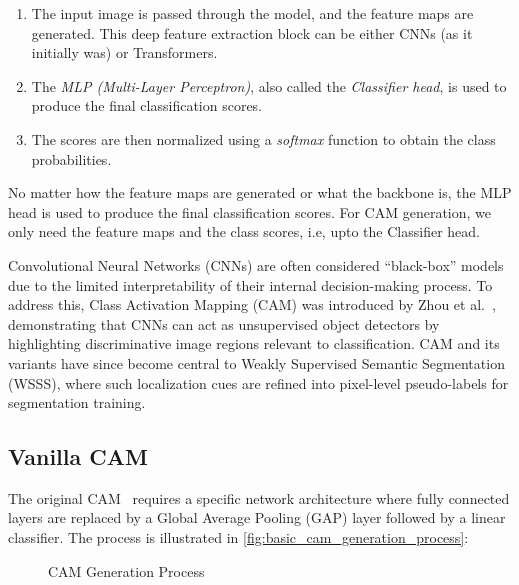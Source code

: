 \begin{enumerate}
    \item The input image is passed through the model, and the feature maps are generated. This deep feature extraction block can be either CNNs (as it initially was) or Transformers.
    \item The \emph{MLP (Multi-Layer Perceptron)}, also called the \emph{Classifier head}, is used to produce the final classification scores.
    \item The scores are then normalized using a \emph{softmax} function to obtain the class probabilities.
\end{enumerate}

No matter how the feature maps are generated or what the backbone is, the MLP head is used to produce the final classification scores. For CAM generation, we only need the feature maps and the class scores, i.e, upto the Classifier head.

Convolutional Neural Networks (CNNs) are often considered “black-box” models due to the limited interpretability of their internal decision-making process. To address this, Class Activation Mapping (CAM) was introduced by Zhou et al.~\cite{cam}, demonstrating that CNNs can act as unsupervised object detectors by highlighting discriminative image regions relevant to classification. CAM and its variants have since become central to Weakly Supervised Semantic Segmentation (WSSS), where such localization cues are refined into pixel-level pseudo-labels for segmentation training.

\subsection{Vanilla CAM}

The original CAM~\cite{cam} requires a specific network architecture where fully connected layers are replaced by a Global Average Pooling (GAP) layer followed by a linear classifier. The process is illustrated in \autoref{fig:basic_cam_generation_process}:

\begin{figure}[htbp]
    \centering
    \caption{CAM Generation Process}
    \label{fig:basic_cam_generation_process}
\end{figure}

